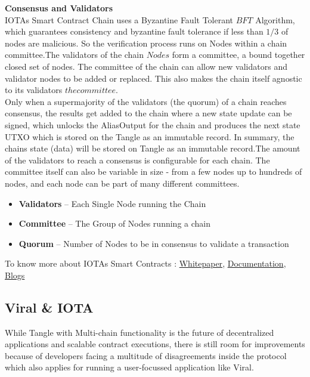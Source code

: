 \documentclass[10pt]{article}
\begin{document}
\textbf{Consensus and Validators}\\

IOTA\textsc{}s Smart Contract Chain uses a Byzantine Fault Tolerant \(BFT\) Algorithm, which guarantees consistency and byzantine fault tolerance if less than $1/3$ of nodes are malicious. So the verification process runs on Nodes within a chain committee.The validators of the chain \(Nodes\) form a committee, a bound together closed set of nodes. The committee of the chain can allow new validators and validator nodes to be added or replaced. This also makes the chain itself agnostic to its validators \(the committee\).\\

Only when a supermajority of the validators (the quorum) of a chain reaches consensus, the results get added to the chain where a new state update can be signed, which unlocks the AliasOutput for the chain and produces the next state UTXO which is stored on the Tangle as an immutable record. In summary, the chain\textsc{}s state (data) will be stored on Tangle as an immutable record.The amount of the validators to reach a consensus is configurable for each chain. The committee itself can also be variable in size - from a few nodes up to hundreds of nodes, and each node can be part of many different committees.

\begin{itemize}[leftmargin=+0.2in]
\item \textbf{Validators} – Each Single Node running the Chain
\item \textbf{Committee} – The Group of Nodes running a chain
\item \textbf{Quorum} – Number of Nodes to be in consensus to validate a transaction
\end{itemize}

To know more about IOTA\textsc{}s Smart Contracts : \hyperlink{https://files.iota.org/papers/ISC_WP_Nov_10_2021.pdf}{Whitepaper}, \hyperlink{https://wiki.iota.org/smart-contracts/overview}{Documentation}, \hyperlink{https://blog.iota.org/iota-smart-contracts-beta-release/}{Blogs}\\

\subsection{Viral \& IOTA}

While Tangle with Multi-chain functionality is the future of decentralized applications and scalable contract executions, there is still room for improvements because of developers facing a multitude of disagreements inside the protocol which also applies for running a user-focussed application like Viral. \\
\end{document}
